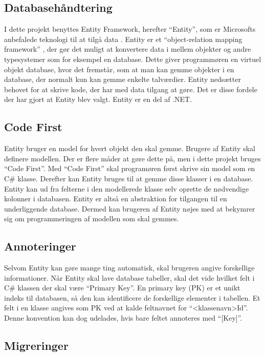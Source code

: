 \subsection{Databasehåndtering}
\label{sec:database}
I dette projekt benyttes Entity Framework, herefter \enquote{Entity}, som er Microsofts anbefalede teknologi til at tilgå data \cite{entity}. Entity er et \enquote{object-relation mapping framework} \cite{lerman2010programming}, der gør det muligt at konvertere data i mellem objekter og andre typesystemer som for eksempel en database. Dette giver programmøren en virtuel objekt database, hvor det fremstår, som at man kan gemme objekter i en database, der normalt kun kan gemme enkelte talværdier. Entity nedsætter behovet for at skrive kode, der har med data tilgang at gøre. Det er disse fordele der har gjort at Entity blev valgt. Entity er en del af .NET.


\subsection{Code First}
\label{sub:code_first}
Entity bruger en model for hvert objekt den skal gemme. Brugere af Entity skal definere modellen. Der er flere måder at gøre dette på, men i dette projekt bruges \enquote{Code First}. Med \enquote{Code First} skal programøren først skrive sin model som en C\# klasse. Derefter kan Entity bruges til at gemme disse klasser i en database. Entity kan ud fra felterne i den modellerede klasse selv oprette de nødvendige kolonner i databasen. Entity er altså en abstraktion for tilgangen til en underliggende database. Dermed kan brugeren af Entity nøjes med at bekymrer sig om programmeringen af modellen som skal gemmes.

\subsection{Annoteringer}
\label{sub:annoteringer}
Selvom Entity kan gøre mange ting automatisk, skal brugeren angive forskellige informationer. Når Entity skal lave database tabeller, skal det vide hvilket felt i C\# klassen der skal være \enquote{Primary Key}. En primary key (PK) er et unikt indeks til databasen, så den kan identificere de forskellige elementer i tabellen. Et felt i en klasse angives som PK ved at kalde feltnavnet for \enquote{<klassenavn>Id}. Denne konvention kan dog udelades, hvis bare feltet annoteres med \enquote{[Key]}.

\subsection{Migreringer}
\label{sub:migreringer}

